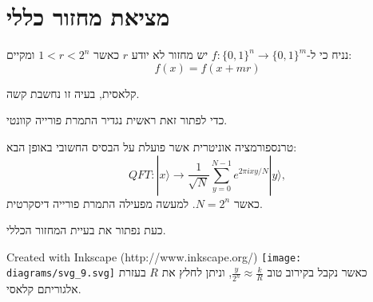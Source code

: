\documentclass{tstextbook}
\begin{document}
\section{מציאת מחזור כללי}

\begin{definition}
נניח כי ל-\(f:\{ 0,1 \}^{n}\to\{ 0,1 \}^{m}\) יש מחזור לא יודע \(r\) כאשר \(1< r < 2^{n}\) ומקיים:
$$f(x)=f(x+mr)$$

\end{definition}
\begin{remark}
קלאסית, בעיה זו נחשבת קשה.

\end{remark}
כדי לפתור זאת ראשית נגדיר התמרת פורייה קוונטי.

\begin{definition}
טרנספורמציה אוניטרית אשר פועלת על הבסיס החשובי באופן הבא:
$$Q F T:|x\rangle\to{\frac{1}{\sqrt{N}}}\sum_{y=0}^{N-1}e^{2\pi i x y/N}|y\rangle,$$
כאשר \(N=2^{n}\). למעשה מפעילה התמרת פורייה דיסקרטית.

\end{definition}
כעת נפתור את בעיית המחזור הכללי.

 Created with Inkscape (http://www.inkscape.org/) \texttt{[image: diagrams/svg\_9.svg]}
כאשר נקבל בקירוב טוב \(\frac{y}{2^{n}}\approx \frac{k}{R}\), וניתן לחלץ את \(R\) בעזרת אלגוריתם קלאסי.
\end{document}
